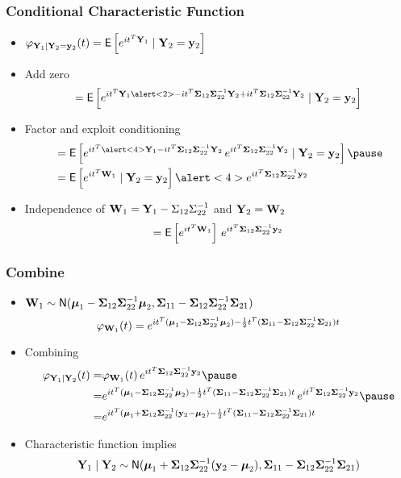 \documentclass{beamer}
\begin{document}
\begin{frame}
  \frametitle{Conditional Characteristic Function }
  \begin{block}{}
    \begin{itemize}
    \item
    $\varphi_{\mathbf{Y}_1 \mid \mathbf{Y}_2 = \mathbf{y}_2}(t) = \textsf{E} \left[ e^{i t^T \mathbf{Y}_1} \mid \mathbf{Y}_2 =
      \mathbf{y}_2 \right]$ \pause
\item Add zero
$$
 = \E \left[ e^{i t^T \Y_1  \alert<2>{-i t^T \Sigmab_{12}\Sigmab_{22}^{-1} \Y_2 +
     i t^T \Sigmab_{12}\Sigmab_{22}^{-1} \Y_2 } } \mid \Y_2 =
      \y_2 \right]
$$  \pause
\item Factor and exploit conditioning
  \begin{eqnarray*}
&  = \E \left[ e^{i t^T \alert<4>{\Y_1  -i t^T \Sigmab_{12}\Sigmab_{22}^{-1} \Y_2}}
      \,  e^{
     i t^T \Sigmab_{12}\Sigmab_{22}^{-1} \Y_2 }  \mid \Y_2 =
      \y_2 \right]  \pause
\\
&  = \E \left[ e^{i t^T \W_1} \mid \Y_2 = \y_2 \right] \alert<4>{e^{
     i t^T \Sigmab_{12}\Sigmab_{22}^{-1} \y_2 }}
  \end{eqnarray*} \pause
\item Independence of
   $\mathbf{W}_1 = \mathbf{Y}_1 - \Sigma_{12}\Sigma_{22}^{-1}$ and $\mathbf{Y}_2 = \mathbf{W}_2$
$$ = \textsf{E} \left[ e^{i t^T \mathbf{W}_1} \right]\,  e^{
     i t^T \boldsymbol{\Sigma}_{12}\boldsymbol{\Sigma}_{22}^{-1} \mathbf{y}_2 }  $$
   \end{itemize}

  \end{block}
\end{frame}
\begin{frame}
  \frametitle{Combine}
  \begin{block}{}
    \begin{itemize}
    \item $\mathbf{W}_1 \sim \textsf{N}( \boldsymbol{\mu}_1 - \boldsymbol{\Sigma}_{12} \boldsymbol{\Sigma}_{22}^{-1}
      \boldsymbol{\mu}_2, \boldsymbol{\Sigma}_{11} - \boldsymbol{\Sigma}_{12} \boldsymbol{\Sigma}_{22}^{-1}
      \boldsymbol{\Sigma}_{21})$ \pause
$$\varphi_{\mathbf{W}_1}(t) = e^{i t^T( \boldsymbol{\mu}_1 - \boldsymbol{\Sigma}_{12} \boldsymbol{\Sigma}_{22}^{-1}
      \boldsymbol{\mu}_2) - \frac{1}{2} t^T (\boldsymbol{\Sigma}_{11} - \boldsymbol{\Sigma}_{12} \boldsymbol{\Sigma}_{22}^{-1}
      \boldsymbol{\Sigma}_{21})t}$$ \pause
\item Combining
  \begin{eqnarray*}
\varphi_{\Y_1 \mid \Y_2} (t)  =  & \varphi_{\W_1}(t) \, e^{  i t^T
    \Sigmab_{12}\Sigmab_{22}^{-1} \y_2 } \pause \\
    = & e^{i t^T( \mub_1 - \Sigmab_{12} \Sigmab_{22}^{-1}
      \mub_2) - \frac{1}{2} t^T (\Sigmab_{11} - \Sigmab_{12} \Sigmab_{22}^{-1}
      \Sigmab_{21})t} \, e^{  i t^T
    \Sigmab_{12}\Sigmab_{22}^{-1} \y_2 } \pause   \\
 =  & e^{i t^T( \mub_1 + \Sigmab_{12} \Sigmab_{22}^{-1}( \y_2 -
      \mub_2) - \frac{1}{2} t^T (\Sigmab_{11} - \Sigmab_{12} \Sigmab_{22}^{-1}
      \Sigmab_{21})t}
  \end{eqnarray*} \pause
\item Characteristic function implies
$$
\mathbf{Y}_1 \mid \mathbf{Y}_2 \sim \textsf{N}( \boldsymbol{\mu}_1 + \boldsymbol{\Sigma}_{12} \boldsymbol{\Sigma}_{22}^{-1}( \mathbf{y}_2 -
      \boldsymbol{\mu}_2),  \boldsymbol{\Sigma}_{11} - \boldsymbol{\Sigma}_{12} \boldsymbol{\Sigma}_{22}^{-1}
      \boldsymbol{\Sigma}_{21})
$$
  \end{itemize}
  \end{block}
\end{frame}
\end{document}
